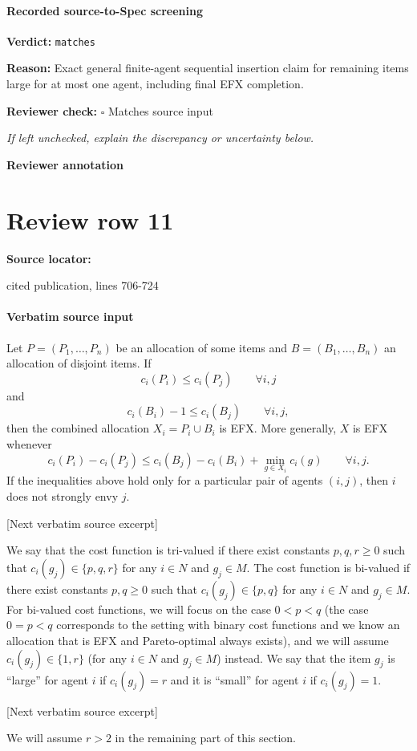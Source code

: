 \documentclass[10pt]{article}
\newcommand{\reviewerbox}{%
  \par\noindent\fbox{\parbox{0.96\linewidth}{\rule{0pt}{0.38in}}}\par
}
\newcommand{\reviewmatch}[1]{%
  \par\noindent\textbf{Reviewer check:} $\square$\; #1\par
  \noindent\emph{If left unchecked, explain the discrepancy or uncertainty below.}\par
}
\begin{document}
\paragraph{Recorded source-to-Spec screening}
\textbf{Verdict:} \texttt{matches}
\\
{\raggedright
\textbf{Reason:} Exact general finite-\allowbreak{}agent sequential insertion claim for remaining items large for at most one agent, including final EFX completion.\allowbreak{}
\par}
\reviewmatch{Matches source input}
\noindent\textbf{Reviewer annotation}\par
\reviewerbox
\clearpage
\hypertarget{source-claim-58fb9c46acb21eca}{}
\section*{Review row 11}
\textbf{Source locator:} {\footnotesize\raggedright cited publication, lines 706-\allowbreak{}724\par}
\paragraph{Verbatim source input}
\begin{ReviewVerbatim}
\begin{lemma}[Composition]\label{lem:composition}
Let $P=(P_1,\ldots,P_n)$ be an allocation of some items and $B=(B_1,\ldots,B_n)$ an allocation of disjoint
items.  If
\[
 c_i(P_i)\le c_i(P_j)\qquad\forall i,j
\]
and
\[
 c_i(B_i)-1\le c_i(B_j)\qquad\forall i,j,
\]
then the combined allocation $X_i=P_i\cup B_i$ is EFX. %
More generally, $X$ is EFX whenever
\[
 c_i(P_i)-c_i(P_j)
 \le c_i(B_j)-c_i(B_i)+\min_{g\in X_i}c_i(g)
 \qquad\forall i,j.
\]
If the inequalities above hold only for a particular pair of agents $(i,j)$, then $i$ does not strongly envy $j$.
\end{lemma}

[Next verbatim source excerpt]

We say that the cost function is tri-valued if there exist constants $p,q,r\geq 0$ such that $c_i(g_j)\in\{p,q,r\}$ for any $i\in N$ and $g_j\in M$.
The cost function is bi-valued if there exist constants $p,q\geq 0$ such that $c_i(g_j)\in\{p,q\}$ for any $i\in N$ and $g_j\in M$.
For bi-valued cost functions, we will focus on the case $0<p<q$ (the case $0=p<q$ corresponds to the setting with binary cost functions and we know an allocation that is EFX and Pareto-optimal always exists), and we will assume $c_i(g_j)\in\{1,r\}$ (for any $i\in N$ and $g_j\in M$) instead.
We say that the item $g_j$ is ``large'' for agent $i$ if $c_i(g_j)=r$ and it is ``small'' for agent $i$ if $c_i(g_j)=1$.

[Next verbatim source excerpt]

We will assume $r>2$ in the remaining part of this section.
\end{ReviewVerbatim}
\end{document}
